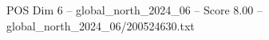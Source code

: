 \begin{textsample}{POS Dim 6 – global\_north\_2024\_06 – Score 8.00 – global\_north\_2024\_06/200524630.txt}
\end{textsample}
